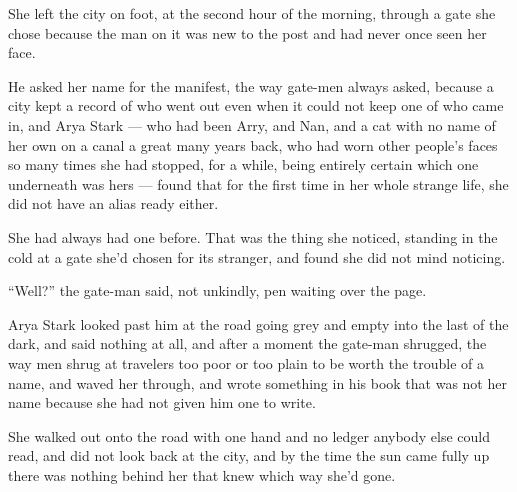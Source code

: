 \sceneBreak

She left the city on foot, at the second hour of the morning, through a gate she chose because the man on it was new to the post and had never once seen her face.

He asked her name for the manifest, the way gate-men always asked, because a city kept a record of who went out even when it could not keep one of who came in, and Arya Stark — who had been Arry, and Nan, and a cat with no name of her own on a canal a great many years back, who had worn other people’s faces so many times she had stopped, for a while, being entirely certain which one underneath was hers — found that for the first time in her whole strange life, she did not have an alias ready either.

She had always had one before. That was the thing she noticed, standing in the cold at a gate she’d chosen for its stranger, and found she did not mind noticing.

“Well?” the gate-man said, not unkindly, pen waiting over the page.

Arya Stark looked past him at the road going grey and empty into the last of the dark, and said nothing at all, and after a moment the gate-man shrugged, the way men shrug at travelers too poor or too plain to be worth the trouble of a name, and waved her through, and wrote something in his book that was not her name because she had not given him one to write.

She walked out onto the road with one hand and no ledger anybody else could read, and did not look back at the city, and by the time the sun came fully up there was nothing behind her that knew which way she’d gone.